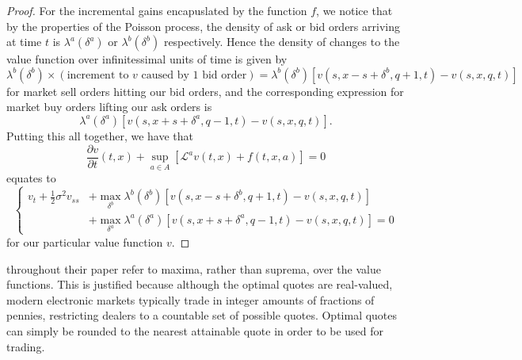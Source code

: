 \begin{proof}
    For the incremental gains encapuslated by the function $f$, we notice that 
    by the properties of the Poisson process, the density of ask or bid orders
    arriving at time $t$ is $\lambda^a(\delta^a)$ or $\lambda^b(\delta^b)$ respectively.
    Hence the density of changes to the value function over infinitessimal units of 
    time is given by 
    \begin{equation*}
        \lambda^b(\delta^b)\times(\textrm{increment to $v$ caused by 1 bid order})=\lambda^b(\delta^b)[v(s,x-s+\delta^b,q+1,t)-v(s,x,q,t)]
    \end{equation*}
    for market sell orders hitting our bid orders, and the corresponding expression 
    for market buy orders lifting our ask orders is 
    \begin{equation*}
        \lambda^a(\delta^a)[v(s,x+s+\delta^a,q-1,t)-v(s,x,q,t)].
    \end{equation*}
    Putting this all together, we have that 
    \begin{equation*}
        \frac{\partial v}{\partial t}(t,x)+\sup_{a\in A}\left[\mathcal{L}^av(t,x)+f(t,x,a)\right]=0
    \end{equation*}
    equates to 
    \begin{equation*}
        \left\{
            \begin{aligned}
                v_t+\frac{1}{2}\sigma^2v_{ss}&+\max\limits_{\delta^b}\lambda^b(\delta^b)[v(s,x-s+\delta^b,q+1,t)-v(s,x,q,t)]\\
                &+\max\limits_{\delta^a}\lambda^a(\delta^a)[v(s,x+s+\delta^a,q-1,t)-v(s,x,q,t)]=0
            \end{aligned}
        \right.
    \end{equation*}
    for our particular value function $v$. 
\end{proof}

\begin{remark}
    \cite{AS2008} throughout their paper refer to maxima, rather than suprema, over
    the value functions. This is justified because although the optimal quotes 
    are real-valued, modern electronic markets typically trade in integer amounts 
    of fractions of pennies, restricting dealers to a countable set of possible quotes.
    Optimal quotes can simply be rounded to the nearest attainable quote in order to 
    be used for trading.
\end{remark}

